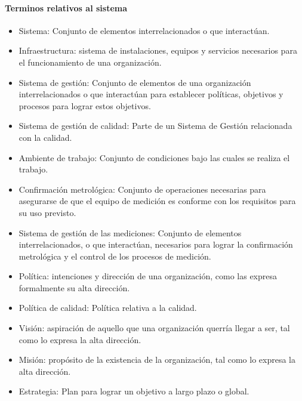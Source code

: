 					\paragraph{Terminos relativos al sistema}
						\begin{itemize}
							\item Sistema: Conjunto de elementos interrelacionados o que interactúan.
							
							\item Infraestructura: sistema de instalaciones, equipos y servicios necesarios para el
							funcionamiento de una organización.
							
							\item Sistema de gestión: Conjunto de elementos de una organización interrelacionados o que interactúan para establecer políticas, objetivos y procesos para lograr estos objetivos.
							
							\item Sistema de gestión de calidad: Parte de un Sistema de Gestión relacionada con la calidad.
							
							\item Ambiente de trabajo: Conjunto de condiciones bajo las cuales se realiza el trabajo.
							
							\item Confirmación metrológica: Conjunto de operaciones necesarias para asegurarse de que el equipo de medición es
							conforme con los requisitos para su uso previsto. 
							
							\item Sistema de gestión de las mediciones: Conjunto de elementos interrelacionados, o que interactúan, necesarios para lograr la confirmación
							metrológica y el control de los procesos de medición.
							
							\item Política: intenciones y dirección de una organización, como las expresa formalmente
							su alta dirección.
							
							\newpage
							\thispagestyle{plain}
							
							\item Política de calidad: Política relativa a la calidad. 
							
							\item Visión: aspiración de aquello que una organización querría llegar a ser, tal como lo expresa la alta dirección.
							
							\item Misión: propósito de la existencia de la organización, tal como lo expresa la alta dirección.
							
							\item Estrategia: Plan para lograr un objetivo a largo plazo o global.
						\end{itemize}
					
